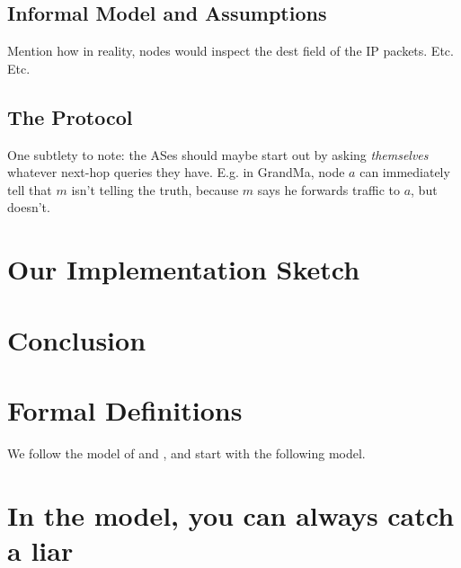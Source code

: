 \documentclass[12pt]{article}
\begin{document}
  \subsection{Informal Model and Assumptions}
    Mention how in reality, nodes would inspect the dest
    field of the IP packets. Etc. Etc.

  \subsection{The Protocol}
    One subtlety to note: the ASes should maybe start out by asking
    \emph{themselves} whatever next-hop queries they have. E.g. in {\sc GrandMa},
    node $a$ can immediately tell that $m$ isn't telling the truth,
    because $m$ says he forwards traffic to $a$, but doesn't.

\section{Our Implementation Sketch}

\section{Conclusion}

{}


\appendix

\section{Formal Definitions}
  We follow the model of \cite{RoutingGames} and \cite{AgtBookDistributed},
  and start with the following model.

\section{In the \cite{RoutingGames} model, you can always catch a liar}
\end{document}
